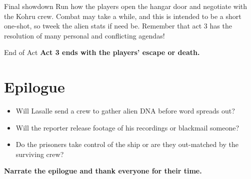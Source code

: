 \newsect 


\begin{rpg-commentbox}{Final showdown}
    Run how the players open the hangar door and negotiate with the Kohru crew. Combat may take a while, and this is intended to be a short one-shot, so tweek the alien stats if need be. Remember that act 3 has the resolution of many personal and conflicting agendas!
 \end{rpg-commentbox}


\begin{rpg-commentbox}{End of Act}
    \textbf{Act 3 ends with the players' escape or death.}
 \end{rpg-commentbox}

\section{Epilogue} 
 
\begin{rpg-commentbox}{}


\begin{itemize}
    \item Will Lasalle send a crew to gather alien DNA before word spreads out?
    \item Will the reporter release footage of his recordings or blackmail someone?
    \item Do the prisoners take control of the ship or are they out-matched by the surviving crew?
\end{itemize}    

    \medskip

    \textbf{Narrate the epilogue and thank everyone for their time.}
    \end{rpg-commentbox}

    \newsect

    